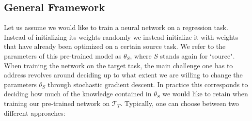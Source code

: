\subsection{General Framework}

Let us assume we would like to train a neural network on a regression task. Instead of initializing its weights randomly we instead initialize it with weights that have already been optimized on a certain source task. We refer to the parameters of this pre-trained model as $\theta_S$, where $S$ stands again for `source". When training the network on the target task, the main challenge one has to address revolves around deciding up to what extent we are willing to change the parameters $\theta_S$ through stochastic gradient descent. In practice this corresponds to deciding how much of the knowledge contained in $\theta_S$ we would like to retain when training our pre-trained network on $\mathcal{T}_T$. Typically, one can choose between two different approaches:  

